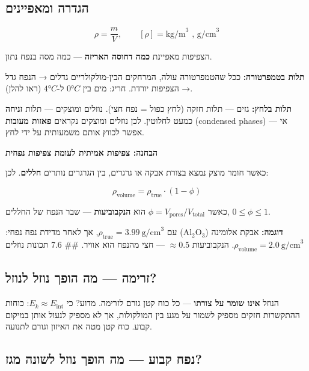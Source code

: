 \documentclass[
  hebrew,
  letterpaper,
  DIV=11,
  numbers=noendperiod]{scrreprt}
\begin{document}
\subsection{הגדרה
ומאפיינים}\label{ux5d4ux5d2ux5d3ux5e8ux5d4-ux5d5ux5deux5d0ux5e4ux5d9ux5d9ux5e0ux5d9ux5dd}

\[\rho = \frac{m}{V}, \qquad [\rho] = \text{kg/m}^3 \text{ , } \text{g/cm}^3\]

הצפיפות מאפיינת \textbf{כמה דחוסה האריזה} --- כמה מסה בנפח נתון.

\textbf{תלות בטמפרטורה:} ככל שהטמפרטורה עולה, המרחקים הבין-מולקולריים
גדלים → הנפח גדל → הצפיפות יורדת. חריג: מים בין \(0°C\) ל-\(4°C\) (ראו
להלן).

\textbf{תלות בלחץ:} גזים --- תלות חזקה (לחץ כפול = נפח חצי). נוזלים
ומוצקים --- תלות \textbf{זניחה} כמעט לחלוטין. לכן נוזלים ומוצקים נקראים
\textbf{פאזות מעובות} (condensed phases) --- אי אפשר לכווץ אותם משמעותית
על ידי לחץ.

\textbf{הבחנה: צפיפות אמיתית לעומת צפיפות נפחית}

כאשר חומר מוצק נמצא בצורת אבקה או גרגרים, בין הגרגרים נותרים
\textbf{חללים}. לכן:

\[\rho_\text{volume} = \rho_\text{true} \cdot (1 - \phi)\]

כאשר \(\phi = V_\text{pores}/V_\text{total}\) הוא \textbf{הנקבוביעות}
--- שבר הנפח של החללים, \(0 \leq \phi \leq 1\).

\textbf{דוגמה:} אבקת אלומינה (\(\text{Al}_2\text{O}_3\)) עם
\(\rho_\text{true} = 3.99\ \text{g/cm}^3\), אך לאחר מדידת נפח נפחי:
\(\rho_\text{volume} = 2.0\ \text{g/cm}^3\). הנקבוביעות \(\approx 0.5\)
--- חצי מהנפח הוא אוויר. \#\# 7.6 תכונות נוזלים

\subsection{זרימה --- מה הופך נוזל
לנוזל?}\label{ux5d6ux5e8ux5d9ux5deux5d4-ux5deux5d4-ux5d4ux5d5ux5e4ux5da-ux5e0ux5d5ux5d6ux5dc-ux5dcux5e0ux5d5ux5d6ux5dc}

הנוזל \textbf{אינו שומר על צורתו} --- כל כוח קטן גורם לזרימה. מדוע? כי
\(E_k \approx E_\text{int}\): כוחות ההתקשרות חזקים מספיק לשמור על מגע
בין המולקולות, אך לא מספיק לנעול אותן במיקום קבוע. כוח קטן מטה את האיזון
וגורם לתנועה.

\subsection{נפח קבוע --- מה הופך נוזל לשונה
מגז?}\label{ux5e0ux5e4ux5d7-ux5e7ux5d1ux5d5ux5e2-ux5deux5d4-ux5d4ux5d5ux5e4ux5da-ux5e0ux5d5ux5d6ux5dc-ux5dcux5e9ux5d5ux5e0ux5d4-ux5deux5d2ux5d6}
\end{document}
